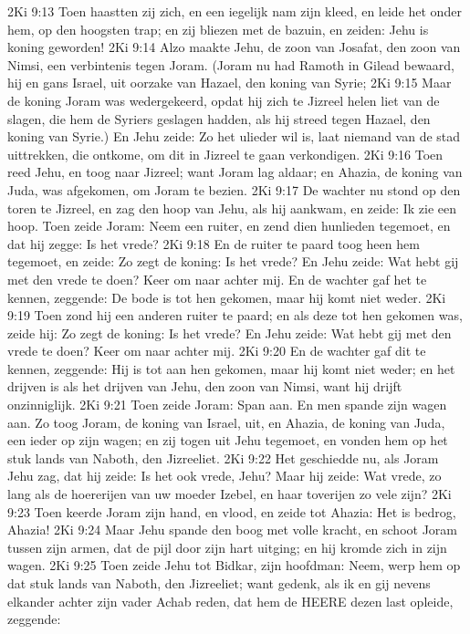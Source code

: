 2Ki 9:13  Toen haastten zij zich, en een iegelijk nam zijn kleed, en leide het onder hem, op den hoogsten trap; en zij bliezen met de bazuin, en zeiden: Jehu is koning geworden!
2Ki 9:14  Alzo maakte Jehu, de zoon van Josafat, den zoon van Nimsi, een verbintenis tegen Joram. (Joram nu had Ramoth in Gilead bewaard, hij en gans Israel, uit oorzake van Hazael, den koning van Syrie;
2Ki 9:15  Maar de koning Joram was wedergekeerd, opdat hij zich te Jizreel helen liet van de slagen, die hem de Syriers geslagen hadden, als hij streed tegen Hazael, den koning van Syrie.) En Jehu zeide: Zo het ulieder wil is, laat niemand van de stad uittrekken, die ontkome, om dit in Jizreel te gaan verkondigen.
2Ki 9:16  Toen reed Jehu, en toog naar Jizreel; want Joram lag aldaar; en Ahazia, de koning van Juda, was afgekomen, om Joram te bezien.
2Ki 9:17  De wachter nu stond op den toren te Jizreel, en zag den hoop van Jehu, als hij aankwam, en zeide: Ik zie een hoop. Toen zeide Joram: Neem een ruiter, en zend dien hunlieden tegemoet, en dat hij zegge: Is het vrede?
2Ki 9:18  En de ruiter te paard toog heen hem tegemoet, en zeide: Zo zegt de koning: Is het vrede? En Jehu zeide: Wat hebt gij met den vrede te doen? Keer om naar achter mij. En de wachter gaf het te kennen, zeggende: De bode is tot hen gekomen, maar hij komt niet weder.
2Ki 9:19  Toen zond hij een anderen ruiter te paard; en als deze tot hen gekomen was, zeide hij: Zo zegt de koning: Is het vrede? En Jehu zeide: Wat hebt gij met den vrede te doen? Keer om naar achter mij.
2Ki 9:20  En de wachter gaf dit te kennen, zeggende: Hij is tot aan hen gekomen, maar hij komt niet weder; en het drijven is als het drijven van Jehu, den zoon van Nimsi, want hij drijft onzinniglijk.
2Ki 9:21  Toen zeide Joram: Span aan. En men spande zijn wagen aan. Zo toog Joram, de koning van Israel, uit, en Ahazia, de koning van Juda, een ieder op zijn wagen; en zij togen uit Jehu tegemoet, en vonden hem op het stuk lands van Naboth, den Jizreeliet.
2Ki 9:22  Het geschiedde nu, als Joram Jehu zag, dat hij zeide: Is het ook vrede, Jehu? Maar hij zeide: Wat vrede, zo lang als de hoererijen van uw moeder Izebel, en haar toverijen zo vele zijn?
2Ki 9:23  Toen keerde Joram zijn hand, en vlood, en zeide tot Ahazia: Het is bedrog, Ahazia!
2Ki 9:24  Maar Jehu spande den boog met volle kracht, en schoot Joram tussen zijn armen, dat de pijl door zijn hart uitging; en hij kromde zich in zijn wagen.
2Ki 9:25  Toen zeide Jehu tot Bidkar, zijn hoofdman: Neem, werp hem op dat stuk lands van Naboth, den Jizreeliet; want gedenk, als ik en gij nevens elkander achter zijn vader Achab reden, dat hem de HEERE dezen last opleide, zeggende:
